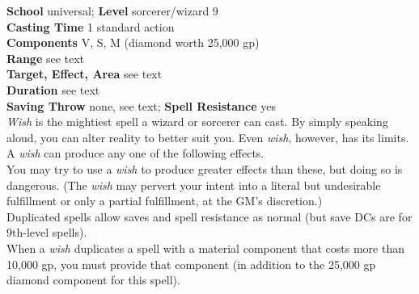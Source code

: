 \textbf{School }universal; \textbf{Level }sorcerer/wizard 9\\
\textbf{Casting Time }1 standard action\\
\textbf{Components }V, S, M (diamond worth 25,000 gp)\\
\textbf{Range }see text\\
\textbf{Target, Effect, Area }see text\\
\textbf{Duration }see text\\
\textbf{Saving Throw} none, see text; \textbf{Spell Resistance} yes\\
\textit{Wish }is the mightiest spell a wizard or sorcerer can cast. By simply speaking aloud, you can alter reality to better suit you. Even \textit{wish}, however, has its limits. A \textit{wish }can produce any one of the following effects.\\
You may try to use a \textit{wish }to produce greater effects than these, but doing so is dangerous. (The \textit{wish }may pervert your intent into a literal but undesirable fulfillment or only a partial fulfillment, at the GM's discretion.)\\
Duplicated spells allow saves and spell resistance as normal (but save DCs are for 9th-level spells).\\
When a \textit{wish }duplicates a spell with a material component that costs more than 10,000 gp, you must provide that component (in addition to the 25,000 gp diamond component for this spell).\\
